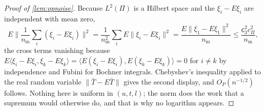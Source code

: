 \begin{proof}[Proof of \cref{lem:opnoise}]
Because $L^{2}(\Pi)$
is a Hilbert space and the $\xi_i-E\xi_i$ are independent with mean zero,
\[
E\Big\|\frac1{n_{\mathrm m}}\sum_{i}(\xi_i-E\xi_i)\Big\|^{2}
=\frac1{n_{\mathrm m}^{2}}\sum_i E\|\xi_i-E\xi_i\|^{2}
=\frac{E\|\xi_1-E\xi_1\|^{2}}{n_{\mathrm m}}\le\frac{\mathsf c_3^{2}c_\Pi^{2}}{n_{\mathrm m}} ,
\]
the cross terms vanishing because $E\langle\xi_i-E\xi_i,\xi_k-E\xi_k\rangle=\langle E(\xi_i-E\xi_i),E(\xi_k-E\xi_k)\rangle=0$
for $i\ne k$ by independence and Fubini for Bochner integrals. Chebyshev's inequality applied to the
real random variable $\|\bar T-E\bar T\|$ gives the second display, and $O_P(n^{-1/2})$ follows.
Nothing here is uniform in $(u,t,l)$; the norm does the work that a supremum would otherwise do,
and that is why no logarithm appears.


\end{proof}
